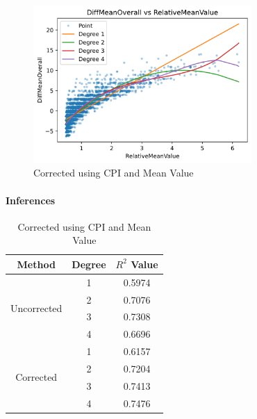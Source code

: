 \documentclass[
  english,
  doc,floatsintext]{apa6}
\let\oldparagraph\paragraph
\renewcommand{\paragraph}[1]{\oldparagraph{#1}\mbox{}}
\begin{document}
\begin{figure}[H]
  \begin{center}
  \includegraphics[width=0.9\linewidth, height=6cm]{assets/DiffMeanOverall vs RelativeMeanValue.png}
  \end{center}
  
  \captionsetup{justification=centering}
  \caption{Corrected using CPI and Mean Value}
\end{figure}

\hypertarget{inferences}{%
\paragraph{Inferences}\label{inferences}}

\begin{table}
  \begin{center}
  \begin{tabular}{|c|c|c|}
  \hline
  \textbf{Method} & \textbf{Degree} & \textbf{$R^2$ Value} \\ \hline
  \multicolumn{1}{|c|}{\multirow{4}{*}{Uncorrected}} & 1      & 0.5974      \\ \cline{2-3} 
  \multicolumn{1}{|c|}{}                             & 2      & 0.7076      \\ \cline{2-3} 
  \multicolumn{1}{|c|}{}                             & 3      & 0.7308      \\ \cline{2-3} 
  \multicolumn{1}{|c|}{}                             & 4      & 0.6696      \\ \hline
  \multirow{4}{*}{Corrected}                         & 1      & 0.6157      \\ \cline{2-3} 
                                                     & 2      & 0.7204      \\ \cline{2-3} 
                                                     & 3      & 0.7413      \\ \cline{2-3} 
                                                     & 4      & 0.7476      \\ \hline
  \end{tabular}
  \end{center}
  
  \captionsetup{justification=centering}
  \caption{Corrected using CPI and Mean Value}
\end{table}
\end{document}
